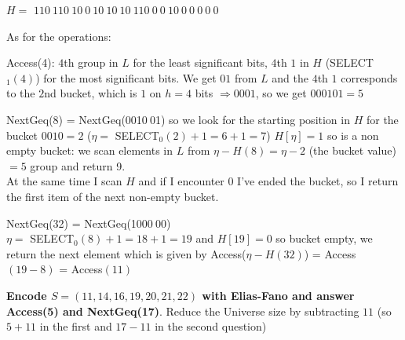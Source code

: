 \documentclass[10pt]{report}
\begin{document}
\begin{list}{}{}
\begin{list}{}{}
		\item[$H =$] $110\:110\:10\:0\:10\:10\:10\:110\:0\:0\:10\:0\:0\:0\:0\:0$
	\end{list}
	As for the operations:
	\begin{list}{}{}
		\item Access(4): $4$th group in $L$ for the least significant bits, $4$th $1$ in $H$ (SELECT$_1(4)$) for the most significant bits. We get $01$ from $L$ and the $4$th $1$ corresponds to the $2$nd bucket, which is $1$ on $h = 4$ bits $\Rightarrow 0001$, so we get $000101 = 5$
		\item NextGeq(8) = NextGeq(0010$\:$01) so we look for the starting position in $H$ for the bucket $0010 = 2$ ($\eta =$ SELECT$_0(2)+1 = 6+1 = 7$) $H[\eta] = 1$ so is a non empty bucket: we scan elements in $L$ from $\eta - H(8) = \eta - 2$ (the bucket value) $ = 5$ group and return 9.\\
		At the same time I scan $H$ and if I encounter 0 I've ended the bucket, so I return the first item of the next non-empty bucket.
		\item NextGeq(32) = NextGeq(1000$\:$00)\\
		$\eta =$ SELECT$_0(8) + 1 = 18+1 = 19$ and $H[19] = 0$ so bucket empty, we return the next element which is given by Access($\eta-H(32)$) = Access$(19-8)$ = Access$(11)$
	\end{list}
	\item \textbf{Encode $S=(11,14,16,19,20,21,22)$ with Elias-Fano and answer Access(5) and NextGeq(17)}. Reduce the Universe size by subtracting $11$ (so $5+11$ in the first and $17-11$ in the second question)
\end{list}
\end{document}
